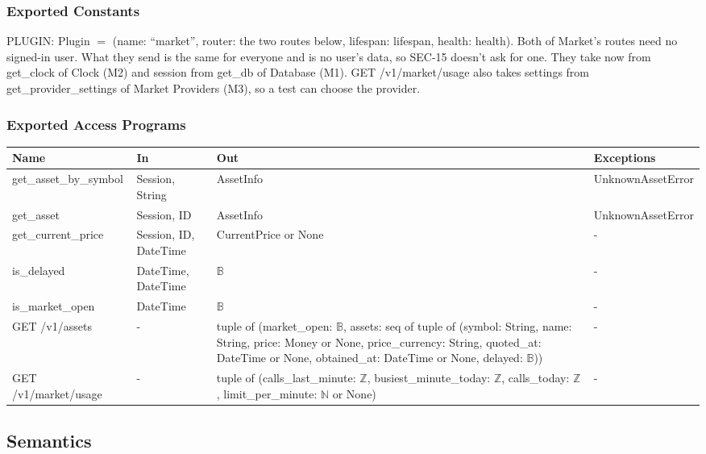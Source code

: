 \documentclass[12pt, titlepage]{article}
\begin{document}
\subsubsection{Exported Constants}

PLUGIN: Plugin $=$ (name: ``market'', router: the two routes below, lifespan:
lifespan, health: health). Both of Market's routes need no signed-in user.
What they send is the same for everyone and is no user's data, so SEC-15
doesn't ask for one. They take now from get\_clock of Clock (M2) and session
from get\_db of Database (M1). GET /v1/market/usage also takes settings from
get\_provider\_settings of Market Providers (M3), so a test can choose the
provider.

\subsubsection{Exported Access Programs}

\begin{center}
\begin{tabular}{>{\raggedright\arraybackslash}p{3.6cm}
  >{\raggedright\arraybackslash}p{2.4cm}
  >{\raggedright\arraybackslash}p{5.1cm} p{3.7cm}}
\toprule
\textbf{Name} & \textbf{In} & \textbf{Out} & \textbf{Exceptions} \\
\midrule
get\_asset\_by\_symbol & Session, String & AssetInfo & UnknownAssetError \\
get\_asset & Session, ID & AssetInfo & UnknownAssetError \\
get\_current\_price & Session, ID, DateTime & CurrentPrice or None & - \\
is\_delayed & DateTime, DateTime & $\mathbb{B}$ & - \\
is\_market\_open & DateTime & $\mathbb{B}$ & - \\
GET /v1/assets & - & tuple of (market\_open: $\mathbb{B}$, assets: seq of
tuple of (symbol: String, name: String, price: Money or None, price\_currency:
String, quoted\_at: DateTime or None, obtained\_at: DateTime or None, delayed:
$\mathbb{B}$)) & - \\
GET /v1/market/usage & - & tuple of (calls\_last\_minute: $\mathbb{Z}$,
busiest\_minute\_today: $\mathbb{Z}$, calls\_today: $\mathbb{Z}$,
limit\_per\_minute: $\mathbb{N}$ or None) & - \\
\bottomrule
\end{tabular}
\end{center}

\subsection{Semantics}
\end{document}
